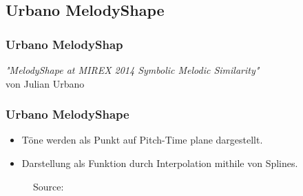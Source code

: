 \documentclass{beamer}
\begin{document}
	\subsection{Urbano MelodyShape}
		\begin{frame}
			\frametitle{Urbano MelodyShap}
			\begin{minipage}{0.45\textwidth}
				\begin{center}
					\textit{"MelodyShape at MIREX 2014 Symbolic Melodic Similarity"} 
					\cite{five_point_two}\\ 
					von Julian Urbano
				\end{center}
			\end{minipage}%
			\begin{minipage}{0.45\textwidth}
				\begin{figure}[h!]
				\end{figure}
			\end{minipage}
		\end{frame}
		
	\begin{frame}
        \frametitle{Urbano MelodyShape}
        \begin{minipage}{0.45\textwidth}
            \begin{itemize}
             \item Töne werden als Punkt  auf Pitch-Time plane dargestellt.
             \item Darstellung als Funktion durch Interpolation mithile von Splines.
            \end{itemize}
        \end{minipage}
        \begin{minipage}{0.45\textwidth}
        \begin{figure}[h!]
             \caption{Source: \cite{five_point_two}}
        \end{figure}
        \end{minipage}
	\end{frame}
	
\end{document}
